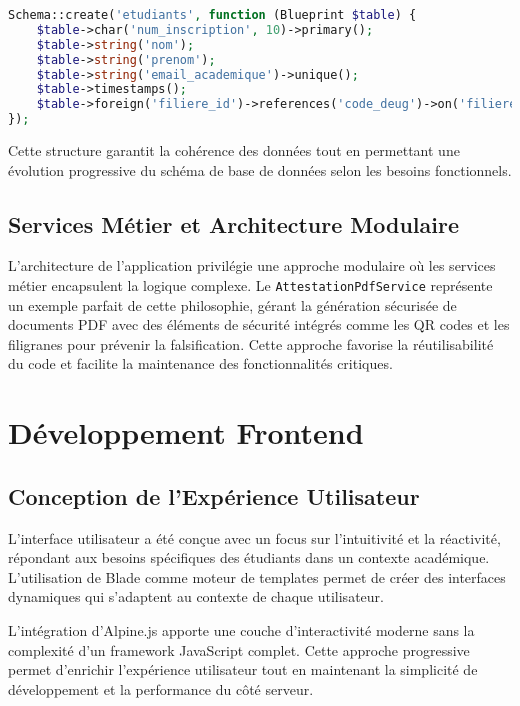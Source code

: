 \documentclass[12pt,a4paper]{report}
\begin{document}
\begin{lstlisting}[language=PHP]
Schema::create('etudiants', function (Blueprint $table) {
    $table->char('num_inscription', 10)->primary();
    $table->string('nom');
    $table->string('prenom');
    $table->string('email_academique')->unique();
    $table->timestamps();
    $table->foreign('filiere_id')->references('code_deug')->on('filieres');
});
\end{lstlisting}

Cette structure garantit la cohérence des données tout en permettant une évolution progressive du schéma de base de données selon les besoins fonctionnels.

\subsection{Services Métier et Architecture Modulaire}

L'architecture de l'application privilégie une approche modulaire où les services métier encapsulent la logique complexe. Le \texttt{AttestationPdfService} représente un exemple parfait de cette philosophie, gérant la génération sécurisée de documents PDF avec des éléments de sécurité intégrés comme les QR codes et les filigranes pour prévenir la falsification. Cette approche favorise la réutilisabilité du code et facilite la maintenance des fonctionnalités critiques.

\section{Développement Frontend}

\subsection{Conception de l'Expérience Utilisateur}

L'interface utilisateur a été conçue avec un focus sur l'intuitivité et la réactivité, répondant aux besoins spécifiques des étudiants dans un contexte académique. L'utilisation de Blade comme moteur de templates permet de créer des interfaces dynamiques qui s'adaptent au contexte de chaque utilisateur.

L'intégration d'Alpine.js apporte une couche d'interactivité moderne sans la complexité d'un framework JavaScript complet. Cette approche progressive permet d'enrichir l'expérience utilisateur tout en maintenant la simplicité de développement et la performance du côté serveur.
\end{document}
